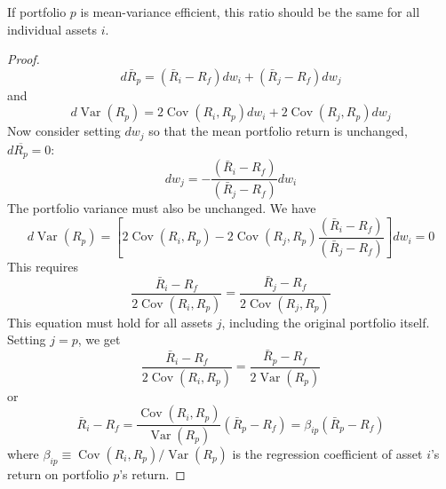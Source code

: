 \documentclass[11pt,green,twocol,citestyle=authoryear, bibstyle=authoryear]{elegantbook}
\begin{document}
\begin{proposition}
    If portfolio $ p $  is mean-variance efficient, this ratio should be the same for all individual assets $ i $.
\end{proposition}
\begin{proof}
    \begin{equation}\label{equ:3.5}
        d \bar{R}_p=\left(\bar{R}_i-R_f\right) d w_i+\left(\bar{R}_j-R_f\right) d w_j
    \end{equation}
    and
    \begin{equation}\label{equ:3.6}
        d \operatorname{Var}\left(R_p\right)=2 \operatorname{Cov}\left(R_i, R_p\right) d w_i+2 \operatorname{Cov}\left(R_j, R_p\right) d w_j
    \end{equation}
    Now consider setting $ dw_j $ so that the mean portfolio return is unchanged, $ d\overline{R_p} = 0 $:
    \begin{equation}\label{equ:3.7}
        d w_j=-\frac{\left(\bar{R}_i-R_f\right)}{\left(\bar{R}_j-R_f\right)} d w_i
    \end{equation}  
    The portfolio variance must also be unchanged. We have
    \begin{equation}\label{equ:3.8}
        d \operatorname{Var}\left(R_p\right)=\left[2 \operatorname{Cov}\left(R_i, R_p\right)-2 \operatorname{Cov}\left(R_j, R_p\right) \frac{\left(\bar{R}_i-R_f\right)}{\left(\bar{R}_j-R_f\right)}\right] d w_i=0
    \end{equation}
    This requires
    \begin{equation}\label{equ:3.9}
        \frac{\bar{R}_i-R_f}{2 \operatorname{Cov}\left(R_i, R_p\right)}=\frac{\bar{R}_j-R_f}{2 \operatorname{Cov}\left(R_j, R_p\right)}
    \end{equation}
    This equation must hold for all assets $ j $, including the original portfolio itself. Setting
    $ j = p $, we get
    \begin{equation}\label{equ:3.10}
        \frac{\bar{R}_i-R_f}{2 \operatorname{Cov}\left(R_i, R_p\right)}=\frac{\bar{R}_p-R_f}{2 \operatorname{Var}\left(R_p\right)}
    \end{equation}
    or
    \begin{equation}\label{equ:3.11}
        \bar{R}_i-R_f=\frac{\operatorname{Cov}\left(R_i, R_p\right)}{\operatorname{Var}\left(R_p\right)}\left(\bar{R}_p-R_f\right)=\beta_{i p}\left(\bar{R}_p-R_f\right)
    \end{equation}
    where $ \beta_{i p} \equiv \operatorname{Cov}\left(R_i, R_p\right) / \operatorname{Var}\left(R_p\right) $ is the regression coefficient of asset $ i $'s return on portfolio $ p $'s return.
\end{proof}
\end{document}
